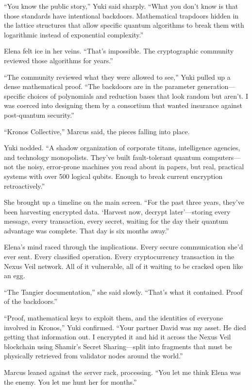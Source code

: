 ``You know the public story,'' Yuki said sharply. ``What you don't know
is that those standards have intentional backdoors. Mathematical
trapdoors hidden in the lattice structures that allow specific quantum
algorithms to break them with logarithmic instead of exponential
complexity.''

Elena felt ice in her veins. ``That's impossible. The cryptographic
community reviewed those algorithms for years.''

``The community reviewed what they were allowed to see,'' Yuki pulled up
a dense mathematical proof. ``The backdoors are in the parameter
generation---specific choices of polynomials and reduction bases that
look random but aren't. I was coerced into designing them by a
consortium that wanted insurance against post-quantum security.''

``Kronos Collective,'' Marcus said, the pieces falling into place.

Yuki nodded. ``A shadow organization of corporate titans, intelligence
agencies, and technology monopolists. They've built fault-tolerant
quantum computers---not the noisy, error-prone machines you read about
in papers, but real, practical systems with over 500 logical qubits.
Enough to break current encryption retroactively.''

She brought up a timeline on the main screen. ``For the past three
years, they've been harvesting encrypted data. `Harvest now, decrypt
later'---storing every message, every transaction, every secret, waiting
for the day their quantum advantage was complete. That day is six months
away.''

Elena's mind raced through the implications. Every secure communication
she'd ever sent. Every classified operation. Every cryptocurrency
transaction in the Nexus Veil network. All of it vulnerable, all of it
waiting to be cracked open like an egg.

``The Tangier documentation,'' she said slowly. ``That's what it
contained. Proof of the backdoors.''

``Proof, mathematical keys to exploit them, and the identities of
everyone involved in Kronos,'' Yuki confirmed. ``Your partner David was
my asset. He died getting that information out. I encrypted it and hid
it across the Nexus Veil blockchain using Shamir's Secret
Sharing---split into fragments that must be physically retrieved from
validator nodes around the world.''

Marcus leaned against the server rack, processing. ``You let me think
Elena was the enemy. You let me hunt her for months.''

